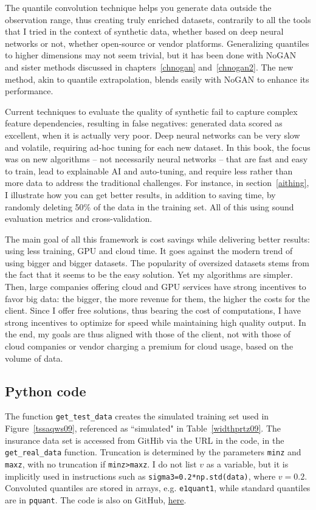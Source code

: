 \documentclass[oneside,10pt]{book}
\begin{document}
The quantile convolution technique helps you generate data outside the observation range, thus
creating truly enriched datasets, contrarily to all the tools that I tried in the context of synthetic data, whether based on deep neural networks or not, whether open-source or vendor platforms.
Generalizing quantiles to higher dimensions may not seem trivial, but it has been done with NoGAN and sister methods discussed in chapters~\ref{chnogan} and~\ref{chnogan2}. The new method, akin to
 quantile extrapolation, blends easily with NoGAN to enhance its performance.

Current techniques to evaluate the quality of synthetic fail to capture complex feature dependencies, resulting in false negatives: generated data scored as excellent, when it is actually very poor. Deep neural networks can be very slow and volatile, requiring ad-hoc tuning for each new dataset. In this book, the focus was on new algorithms -- not necessarily neural networks -- that are fast and easy to train, lead to
 explainable AI and auto-tuning, and require less rather than more data to address the traditional challenges.
 For instance, in section~\ref{aithing}, I illustrate how you can get better results, in addition to saving time,
 by randomly deleting 50\% of the data in the training set. All of this using sound evaluation metrics
 and cross-validation.

The main goal of all this framework is cost savings while delivering better results: using less training, GPU and cloud time. It goes
 against the modern trend of using bigger and bigger datasets. The popularity of oversized datasets stems from the fact that it seems to be the easy solution. Yet my algorithms are simpler. Then, large companies offering
 cloud and GPU services have strong incentives to favor big data: the bigger, the more revenue for them, the
 higher the costs for the client. Since I offer free solutions, thus bearing the cost of computations, I have strong incentives to optimize for speed while maintaining high quality output. In the end, my goals are thus aligned
 with those of the client, not with those of cloud companies or vendor charging a premium for cloud usage, based on the volume of data.


\subsection{Python code}\label{pylgore}

The function \texttt{get\_test\_data} creates the simulated training set used in Figure~\ref{tssaqws09},
 referenced as ``simulated" in Table~\ref{widthprtz09}. The insurance data set is accessed
 from GitHib via the URL in the code, in the \texttt{get\_real\_data} function. Truncation
 is determined by the parameters \texttt{minz} and \texttt{maxz}, with no truncation
 if \texttt{minz>maxz}. I do not list $v$ as a variable, but it is
 implicitly used in instructions such as \texttt{sigma3=0.2*np.std(data)}, where $v=0.2$.
 Convoluted quantiles are stored in arrays, e.g. \texttt{e1quant1}, while standard
 quantiles are in \texttt{pquant}.
The code is also on GitHub,
 \href{https://github.com/VincentGranville/Statistical-Optimization/blob/main/equantile.py}{here}.
\vspace{1ex}
\end{document}
